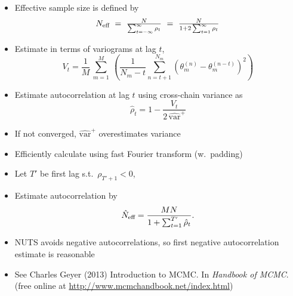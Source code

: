 \documentclass[10pt]{report}
\begin{document}
%
\begin{itemize}
\item Effective sample size is defined by
\[\textstyle
N_{\mbox{\scriptsize eff}}
\ = \
\frac{N}{\sum_{t = -\infty}^{\infty} \rho_t}
\ = \
\frac{N}{1 + 2 \sum_{t = 1}^{\infty} \rho_t}
\]
\item Estimate in terms of variograms at lag $t$,
\[\textstyle
V_t =
\frac{1}{M}
\,
\sum_{m=1}^M
\
\left(
\frac{1}{N_m - t}
\sum_{n=t+1}^{N_m}
\left(
\theta_m^{(n)} - \theta_m^{(n-t)}
\right)^2
\right)
\]
\item Estimate autocorrelation at lag $t$ using cross-chain variance
  as
\[
\hat{\rho}_t
= 1 - \frac{\displaystyle V_t}{
            \displaystyle 2 \, \widehat{\mbox{var}}^{+}}
\]
\item If not converged, $\widehat{\mbox{var}}^{+}$ overestimates variance
\item Efficiently calculate using fast Fourier transform (w.\ padding)
\end{itemize}


%
\begin{itemize}
\item Let $T'$ be first lag s.t.\ $\rho_{T' + 1} < 0$,
\item Estimate autocorrelation by
\[
\hat{N}_{\mbox{\scriptsize eff}}
=
\frac{MN}
     {1 + \sum_{t=1}^{T'} \hat{\rho}_t}.
\]
\item NUTS avoids negative autocorrelations, so first negative
  autocorrelation estimate is reasonable
\vfill
\item See {\footnotesize Charles Geyer (2013) Introduction to MCMC. In
    {\slshape Handbook of MCMC}.
 (free online at \url{http://www.mcmchandbook.net/index.html})}
\end{itemize}
\end{document}
